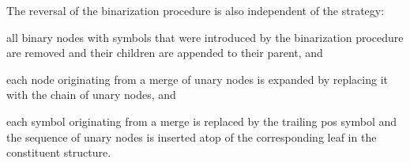 \documentclass[../document.tex]{subfiles}
\begin{document}
    The reversal of the binarization procedure is also independent of the strategy:
    \begin{compactenum}
        \item all binary nodes with symbols that were introduced by the binarization procedure are removed and their children are appended to their parent, and
        \item each node originating from a merge of unary nodes is expanded by replacing it with the chain of unary nodes, and
        \item each  symbol originating from a merge is replaced by the trailing pos symbol and the sequence of unary nodes is inserted atop of the corresponding leaf in the constituent structure.
    \end{compactenum}

\end{document}
